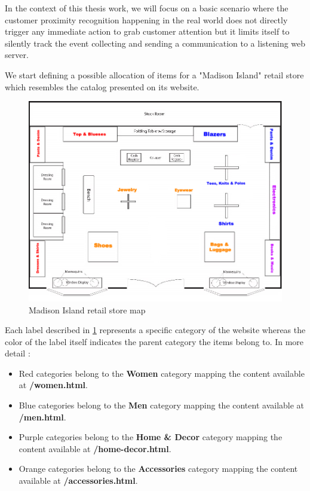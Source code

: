 In the context of this thesis work, we will focus on a basic scenario where the customer proximity recognition happening in the real world does not directly trigger any immediate action to grab customer attention but it limits itself to silently track the event collecting and sending a communication to a listening web server.

We start defining a possible allocation of items for a "Madison Island" retail store which resembles the catalog presented on its website.

\vspace{0.5cm}
\begin{figure}[H]
  \centering
    \includegraphics[width=16cm]{images/madison/retail-map.jpg}
  \caption{Madison Island retail store map}
  \label{fig:retail-map}
\end{figure}
\vspace{0.5cm}

Each label described in \ref{fig:retail-map} represents a specific category of the website whereas the color of the label itself indicates the parent category the items belong to. In more detail :

\begin{itemize}
  \item Red categories belong to the \textbf{Women} category mapping the content available at \textbf{/women.html}. 
  \item Blue categories belong to the \textbf{Men} category mapping the content available at \textbf{/men.html}.
  \item Purple categories belong to the \textbf{Home \& Decor} category mapping the content available at \textbf{/home-decor.html}. 
  \item Orange categories belong to the \textbf{Accessories} category mapping the content available at \textbf{/accessories.html}. 
\end{itemize}

